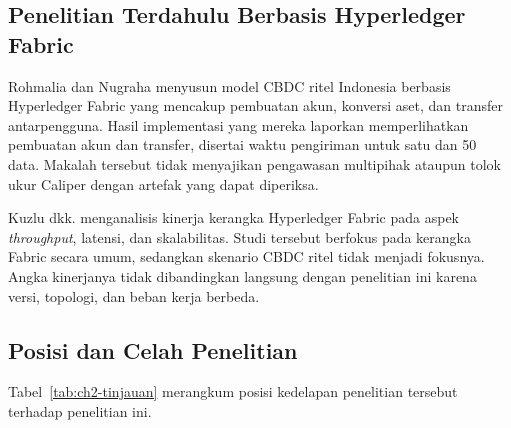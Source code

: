 \subsection{Penelitian Terdahulu Berbasis Hyperledger Fabric}

Rohmalia dan Nugraha \cite{rohmalia2023retail} menyusun model CBDC ritel Indonesia
berbasis Hyperledger Fabric yang mencakup pembuatan akun, konversi aset, dan
transfer antarpengguna. Hasil implementasi yang mereka laporkan memperlihatkan
pembuatan akun dan transfer, disertai waktu pengiriman untuk satu dan 50 data.
Makalah tersebut tidak menyajikan pengawasan multipihak ataupun tolok ukur Caliper
dengan artefak yang dapat diperiksa.

Kuzlu dkk. \cite{fabric_perf2023} menganalisis kinerja kerangka Hyperledger Fabric
pada aspek \textit{throughput}, latensi, dan skalabilitas. Studi tersebut berfokus
pada kerangka Fabric secara umum, sedangkan skenario CBDC ritel tidak menjadi
fokusnya. Angka kinerjanya tidak dibandingkan langsung dengan penelitian ini karena
versi, topologi, dan beban kerja berbeda.

\subsection{Posisi dan Celah Penelitian}

Tabel~\ref{tab:ch2-tinjauan} merangkum posisi kedelapan penelitian tersebut
terhadap penelitian ini.

